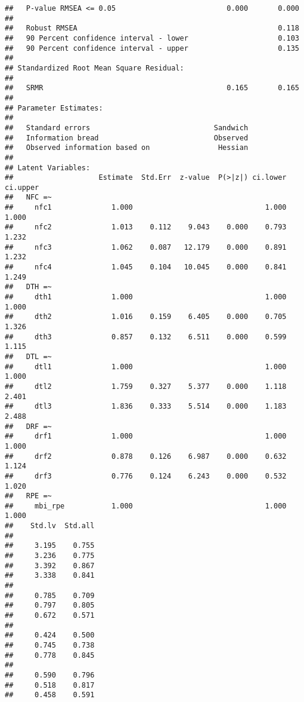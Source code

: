 \documentclass[
  english,
  man]{apa6}
\begin{document}
\begin{verbatim}
##   P-value RMSEA <= 0.05                          0.000       0.000
##                                                                   
##   Robust RMSEA                                               0.118
##   90 Percent confidence interval - lower                     0.103
##   90 Percent confidence interval - upper                     0.135
## 
## Standardized Root Mean Square Residual:
## 
##   SRMR                                           0.165       0.165
## 
## Parameter Estimates:
## 
##   Standard errors                             Sandwich
##   Information bread                           Observed
##   Observed information based on                Hessian
## 
## Latent Variables:
##                    Estimate  Std.Err  z-value  P(>|z|) ci.lower ci.upper
##   NFC =~                                                                
##     nfc1              1.000                               1.000    1.000
##     nfc2              1.013    0.112    9.043    0.000    0.793    1.232
##     nfc3              1.062    0.087   12.179    0.000    0.891    1.232
##     nfc4              1.045    0.104   10.045    0.000    0.841    1.249
##   DTH =~                                                                
##     dth1              1.000                               1.000    1.000
##     dth2              1.016    0.159    6.405    0.000    0.705    1.326
##     dth3              0.857    0.132    6.511    0.000    0.599    1.115
##   DTL =~                                                                
##     dtl1              1.000                               1.000    1.000
##     dtl2              1.759    0.327    5.377    0.000    1.118    2.401
##     dtl3              1.836    0.333    5.514    0.000    1.183    2.488
##   DRF =~                                                                
##     drf1              1.000                               1.000    1.000
##     drf2              0.878    0.126    6.987    0.000    0.632    1.124
##     drf3              0.776    0.124    6.243    0.000    0.532    1.020
##   RPE =~                                                                
##     mbi_rpe           1.000                               1.000    1.000
##    Std.lv  Std.all
##                   
##     3.195    0.755
##     3.236    0.775
##     3.392    0.867
##     3.338    0.841
##                   
##     0.785    0.709
##     0.797    0.805
##     0.672    0.571
##                   
##     0.424    0.500
##     0.745    0.738
##     0.778    0.845
##                   
##     0.590    0.796
##     0.518    0.817
##     0.458    0.591

\end{verbatim}
\end{document}
